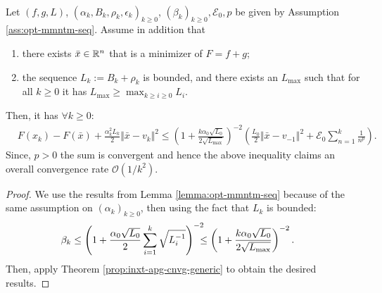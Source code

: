 \documentclass[12pt]{article}
\begin{document}
        \begin{remark}
        \end{remark}
        \begin{proposition}\;\label{prop:opt-cnvg-outr-loop}\\
            Let $(f, g, L)$, $(\alpha_k, B_k, \rho_k, \epsilon_k)_{k \ge 0}$, $(\beta_k)_{k\ge 0}, \mathcal E_0, p$ be given by Assumption \ref{ass:opt-mmntm-seq}. 
            Assume in addition that
            \begin{enumerate}[nosep]
                \item there exists $\bar x \in \mathbb R^n$ that is a minimizer of $F = f + g$;
                \item the sequence $L_k := B_k + \rho_k$ is bounded, and there exists an $L_{\max}$ such that for all $k \ge 0$ it has $L_{\max} \ge \max_{k\ge i\ge 0} L_i$. 
            \end{enumerate}
            Then, it has $\forall k \ge 0$: 
            \begin{align*}
                & F(x_k) - F(\bar x) + \frac{\alpha_k^2L_k}{2}\Vert \bar x - v_k\Vert^2
                \le 
                \left(
                    1 + \frac{k\alpha_0\sqrt{L_0}}{2\sqrt{L_{\max}}}
                \right)^{-2}\left(
                    \frac{L_0}{2}\Vert \bar x - v_{-1}\Vert^2
                    + \mathcal E_0 \sum_{n = 1}^{k} \frac{1}{n^p}
                \right). 
            \end{align*}
            Since, $p > 0$ the sum is convergent and hence the above inequality claims an overall convergence rate $\mathcal O(1/k^2)$. 
        \end{proposition}
        \begin{proof}
            We use the results from Lemma \ref{lemma:opt-mmntm-seq} because of the same assumption on $(\alpha_k)_{k 
            \ge 0}$, then using the fact that $L_k$ is bounded: 
            \begin{align*}
                \beta_k &\le 
                \left(
                    1 + \frac{\alpha_0\sqrt{L_0}}{2}\sum_{i = 1}^{k} \sqrt{L_i^{-1}}
                \right)^{-2}
                \hspace{-0.7em}\le 
                \left(
                    1 + \frac{k\alpha_0\sqrt{L_0}}{2\sqrt{L_{\max}}}
                \right)^{-2}. 
            \end{align*}
            Then, apply Theorem \ref{prop:inxt-apg-cnvg-generic} to obtain the desired results.
        \end{proof}
\end{document}
